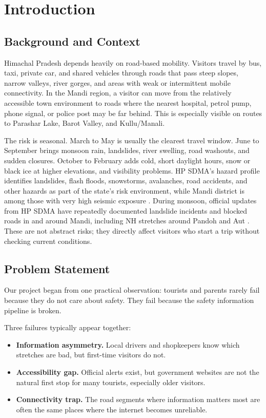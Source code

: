 \documentclass[12pt,a4paper]{article}
\begin{document}
\section{Introduction}

\subsection{Background and Context}

Himachal Pradesh depends heavily on road-based mobility. Visitors travel by bus, taxi, private car, and shared vehicles through roads that pass steep slopes, narrow valleys, river gorges, and areas with weak or intermittent mobile connectivity. In the Mandi region, a visitor can move from the relatively accessible town environment to roads where the nearest hospital, petrol pump, phone signal, or police post may be far behind. This is especially visible on routes to Parashar Lake, Barot Valley, and Kullu/Manali.

The risk is seasonal. March to May is usually the clearest travel window. June to September brings monsoon rain, landslides, river swelling, road washouts, and sudden closures. October to February adds cold, short daylight hours, snow or black ice at higher elevations, and visibility problems. HP SDMA's hazard profile identifies landslides, flash floods, snowstorms, avalanches, road accidents, and other hazards as part of the state's risk environment, while Mandi district is among those with very high seismic exposure \cite{hpsdma_hazard}. During monsoon, official updates from HP SDMA have repeatedly documented landslide incidents and blocked roads in and around Mandi, including NH stretches around Pandoh and Aut \cite{hpsdma_incident}. These are not abstract risks; they directly affect visitors who start a trip without checking current conditions.

\subsection{Problem Statement}

Our project began from one practical observation: tourists and parents rarely fail because they do not care about safety. They fail because the safety information pipeline is broken.

Three failures typically appear together:

\begin{itemize}
  \item \textbf{Information asymmetry.} Local drivers and shopkeepers know which stretches are bad, but first-time visitors do not.
  \item \textbf{Accessibility gap.} Official alerts exist, but government websites are not the natural first stop for many tourists, especially older visitors.
  \item \textbf{Connectivity trap.} The road segments where information matters most are often the same places where the internet becomes unreliable.
\end{itemize}
\end{document}
